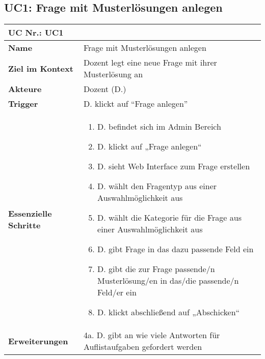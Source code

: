 \begin{table}[h] 
\subsection{UC1: Frage mit Musterlösungen anlegen}
	\begin{tabular}{|p{3cm}|p{11.06cm}|}
	\hline
		\multicolumn{2}{|l|}{\textbf{UC Nr.: UC1} }   \\ \hline
		\textbf{Name}                 &      Frage mit Musterlösungen anlegen   \\ \hline
		\textbf{Ziel im Kontext}      &      Dozent legt eine neue Frage mit ihrer Musterlösung an   \\ \hline
		\textbf{Akteure}              &      Dozent (D.)   \\ \hline
		\textbf{Trigger}              &      D. klickt auf "`Frage anlegen"'   \\ \hline
		\textbf{Essenzielle Schritte} & 			
			\begin{enumerate}
			  \item D. befindet sich im Admin Bereich
			  \item D. klickt auf „Frage anlegen“
			  \item D. sieht Web Interface zum Frage erstellen
			  \item	D. wählt den Fragentyp aus einer Auswahlmöglichkeit aus
			  \item D. wählt die Kategorie für die Frage aus einer Auswahlmöglichkeit aus
			  \item D. gibt Frage in das dazu passende Feld ein
			  \item D. gibt die zur Frage passende/n Musterlösung/en in das/die passende/n Feld/er ein
			  \item D. klickt abschließend auf „Abschicken“
			\end{enumerate}			
		\\ \hline
		\textbf{Erweiterungen} 		  &   4a. D. gibt an wie viele Antworten für Auflistaufgaben gefordert werden     \\ \hline
	\end{tabular}
\end{table}\FloatBarrier

